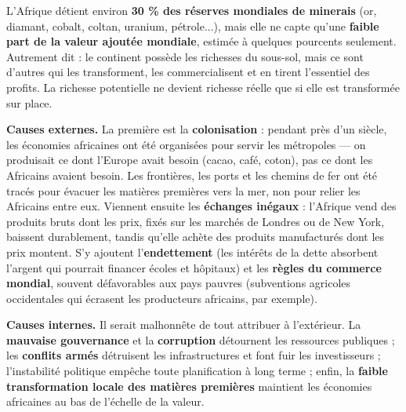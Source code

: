 \documentclass[11pt]{article}
\newcounter{popsec}
\newcounter{popsub}
\newcommand{\courssub}[1]{%
  \stepcounter{popsub}%
  \par\vspace{9pt}\noindent{\popxbold\fontsize{11.5}{13}\selectfont\color{popink}{\color{poporange}\thepopsec.\thepopsub}\hspace{6pt}#1}\par\nopagebreak\vspace{4pt}
}
\begin{document}
\begin{exemplebox}
L'Afrique détient environ \textbf{30 \% des réserves mondiales de minerais} (or, diamant, cobalt, coltan, uranium, pétrole...), mais elle ne capte qu'une \textbf{faible part de la valeur ajoutée mondiale}, estimée à quelques pourcents seulement. Autrement dit : le continent possède les richesses du sous-sol, mais ce sont d'autres qui les transforment, les commercialisent et en tirent l'essentiel des profits. La richesse potentielle ne devient richesse réelle que si elle est transformée sur place.
\end{exemplebox}

\courssub{Les causes du sous-développement}

\textbf{Causes externes.} La première est la \textbf{colonisation} : pendant près d'un siècle, les économies africaines ont été organisées pour servir les métropoles — on produisait ce dont l'Europe avait besoin (cacao, café, coton), pas ce dont les Africains avaient besoin. Les frontières, les ports et les chemins de fer ont été tracés pour évacuer les matières premières vers la mer, non pour relier les Africains entre eux. Viennent ensuite les \textbf{échanges inégaux} : l'Afrique vend des produits bruts dont les prix, fixés sur les marchés de Londres ou de New York, baissent durablement, tandis qu'elle achète des produits manufacturés dont les prix montent. S'y ajoutent l'\textbf{endettement} (les intérêts de la dette absorbent l'argent qui pourrait financer écoles et hôpitaux) et les \textbf{règles du commerce mondial}, souvent défavorables aux pays pauvres (subventions agricoles occidentales qui écrasent les producteurs africains, par exemple).

\textbf{Causes internes.} Il serait malhonnête de tout attribuer à l'extérieur. La \textbf{mauvaise gouvernance} et la \textbf{corruption} détournent les ressources publiques ; les \textbf{conflits armés} détruisent les infrastructures et font fuir les investisseurs ; l'instabilité politique empêche toute planification à long terme ; enfin, la \textbf{faible transformation locale des matières premières} maintient les économies africaines au bas de l'échelle de la valeur.
\end{document}
